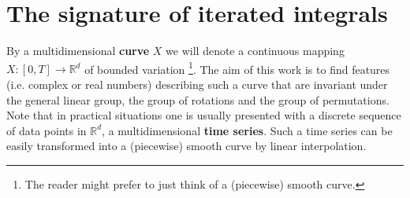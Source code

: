 \documentclass{scrartcl}
\theoremstyle{plain}
\theoremstyle{definition}
\newcommand{\R}{\mathbb{R}}
\newcommand{\1}[1]{1_{\{#1\}}}
\let\todon\todo
\newcommand{\todonotes}[1]{\todon{\color{red}#1}}
\renewcommand{\todo}[1]{ \textbf{\color{Orange}(#1)} }
\newcommand{\ds}{d} %
\begin{document}
\section{The signature of iterated integrals}
\label{sec:signature}

%
%

By a multidimensional \textbf{curve} $X$ we will denote a continuous mapping $X: [0,T] \to \R^\ds$ of bounded variation%
\footnote{
  The reader might prefer to just think of a (piecewise) smooth curve.
}.
%
The aim of this work is to find features (i.e. complex or real numbers) describing such a curve that are invariant under
the general linear group, the group of rotations and the group of permutations.
%
Note that in practical situations one is usually presented with a discrete sequence of data points in $\R^\ds$, a multidimensional \textbf{time series}.
Such a time series can be easily transformed into a (piecewise) smooth curve
by linear interpolation.
\end{document}
